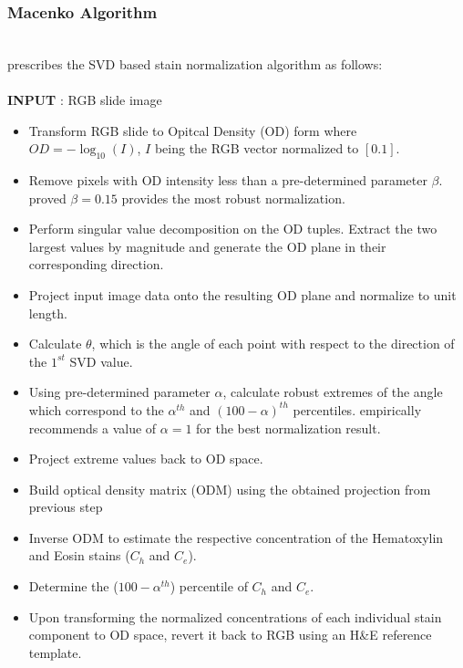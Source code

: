 \documentclass{l4proj}
\begin{document}
\subsubsection{Macenko Algorithm} \label{macenko-alg}
\hfill\\
\cite{macenko2009method} prescribes the SVD based stain normalization algorithm as follows:\\
\\
\textbf{INPUT} : RGB slide image
\begin{itemize}
    \item Transform RGB slide to Opitcal Density (OD) form where \(OD = -\log_{10}(I)\), \(I\) being the RGB vector normalized to \([0.1]\).
    \item Remove pixels with OD intensity less than a pre-determined parameter \(\beta\). \cite{macenko2009method} proved \(\beta = 0.15\) provides the most robust normalization.
    \item Perform singular value decomposition on the OD tuples. Extract the two largest values by magnitude and generate the OD plane in their corresponding direction.
    \item Project input image data onto the resulting OD plane and normalize to unit length.
    \item Calculate \(\theta\), which is the angle of each point with respect to the direction of the \(1^{st}\) SVD value.
    \item Using pre-determined parameter \(\alpha\), calculate robust extremes of the angle which correspond to the \(\alpha^{th}\) and \((100 - \alpha)^{th}\) percentiles. \cite{macenko2009method} empirically recommends a value of \(\alpha = 1\) for the best normalization result. 
    \item Project extreme values back to OD space.
    \item Build optical density matrix (ODM) using the obtained projection from previous step
    \item Inverse ODM to estimate the respective concentration of the Hematoxylin and Eosin stains (\(C_h\) and \(C_e\)). 
    \item Determine the (\(100 - \alpha^{th}\)) percentile of \(C_h\) and \(C_e\).
    \item Upon transforming the normalized concentrations of each individual stain component to OD space, revert it back to RGB using an H\&E reference template. 
\end{itemize}
\end{document}
